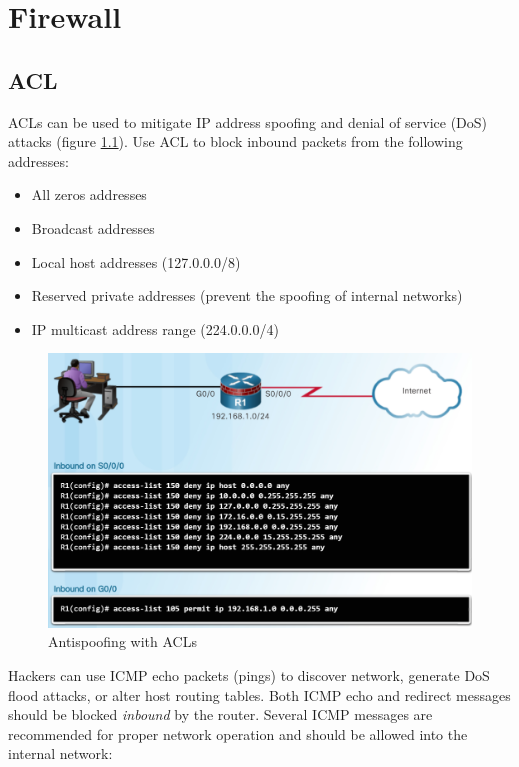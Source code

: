 \chapter{Firewall}

\section{ACL}

ACLs can be used to mitigate IP address spoofing and denial of service (DoS) attacks (figure \ref{AntispoofingACL}). Use ACL to block inbound packets from the following addresses:

\begin{itemize}
\item All zeros addresses
\item Broadcast addresses
\item Local host addresses (127.0.0.0/8)
\item Reserved private addresses (prevent the spoofing of internal networks)
\item IP multicast address range (224.0.0.0/4)
\end{itemize}

\begin{figure}[hbtp]
  \caption{Antispoofing with ACLs}\label{AntispoofingACL}
  \centering
  \includegraphics[width=10\xm]{pictures/AntispoofingACL.PNG}
  \end{figure}

Hackers can use ICMP echo packets (pings) to discover network, generate DoS flood attacks, or alter host routing tables. Both ICMP echo and redirect messages should be blocked \emph{inbound} by the router. Several ICMP messages are recommended for proper network operation and should be allowed into the internal network:

